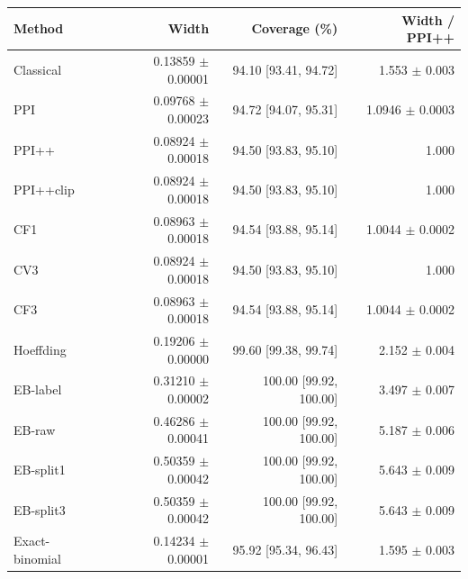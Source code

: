 \small
\begin{tabular}{lrrr}
\toprule
Method & Width & Coverage (\%) & Width / PPI++ \\
\midrule
Classical & 0.13859 $\pm$ 0.00001 & 94.10 [93.41, 94.72] & 1.553 $\pm$ 0.003 \\
PPI & 0.09768 $\pm$ 0.00023 & 94.72 [94.07, 95.31] & 1.0946 $\pm$ 0.0003 \\
PPI++ & 0.08924 $\pm$ 0.00018 & 94.50 [93.83, 95.10] & 1.000 \\
PPI++clip & 0.08924 $\pm$ 0.00018 & 94.50 [93.83, 95.10] & 1.000 \\
CF1 & 0.08963 $\pm$ 0.00018 & 94.54 [93.88, 95.14] & 1.0044 $\pm$ 0.0002 \\
CV3 & 0.08924 $\pm$ 0.00018 & 94.50 [93.83, 95.10] & 1.000 \\
CF3 & 0.08963 $\pm$ 0.00018 & 94.54 [93.88, 95.14] & 1.0044 $\pm$ 0.0002 \\
Hoeffding & 0.19206 $\pm$ 0.00000 & 99.60 [99.38, 99.74] & 2.152 $\pm$ 0.004 \\
EB-label & 0.31210 $\pm$ 0.00002 & 100.00 [99.92, 100.00] & 3.497 $\pm$ 0.007 \\
EB-raw & 0.46286 $\pm$ 0.00041 & 100.00 [99.92, 100.00] & 5.187 $\pm$ 0.006 \\
EB-split1 & 0.50359 $\pm$ 0.00042 & 100.00 [99.92, 100.00] & 5.643 $\pm$ 0.009 \\
EB-split3 & 0.50359 $\pm$ 0.00042 & 100.00 [99.92, 100.00] & 5.643 $\pm$ 0.009 \\
Exact-binomial & 0.14234 $\pm$ 0.00001 & 95.92 [95.34, 96.43] & 1.595 $\pm$ 0.003 \\
\bottomrule
\end{tabular}
